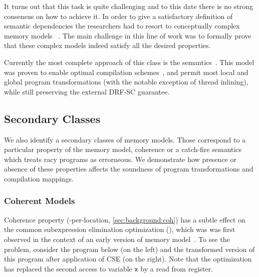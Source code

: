 It turns out that this task is quite challenging 
and to this date there is no strong consensus on how to achieve it.
In order to give a satisfactory definition of semantic dependencies 
the researchers had to resort to conceptually complex memory models%
~\cite{Jagadeesan-al:ESOP10, Kang-al:POPL17, Jeffrey-Riely:LICS16, 
PichonPharabod-Sewell:POPL16, Chakraborty-Vafeiadis:POPL19, Paviotti-al:ESOP20}.
The main challenge in this line of work was to formally prove 
that these complex models indeed satisfy all the desired properties. 

Currently the most complete approach of this class 
is the \Promising semantics~\cite{Kang-al:POPL17, Lee-al:PLDI20}. 
This model was proven to enable optimal compilation schemes~\cite{Podkopaev-al:POPL19}, 
and permit most local and global program transformations
(with the notable exception of thread inlining), 
while still preserving the external DRF-SC guarantee.

\subsection{Secondary Classes}
\label{sec:other-classes}

We also identify a secondary classes of memory models. 
Those correspond to a particular property of the memory model, 
\eg coherence or a catch-fire semantics which treats racy programs 
as errorneous. We demonstrate how presence or absence of these properties 
affects the soundness of program transformations and compilation mappings.

\subsubsection{Coherent Models}
\label{sec:analysis:coh}

Coherence property (\ie \SC-per-location, \cref{sec:background:coh})
has a subtle effect on the common subexpression elimination optimization (\CSE),
which was was first observed in the context of an early version of \Java 
memory model~\cite{Pugh:JAVA99}.
To see the problem, consider the program below
(on the left) and the transformed version 
of this program after application of CSE (on the right).
Note that the optimization has replaced 
the second access to variable \texttt{x}
by a read from register. 

